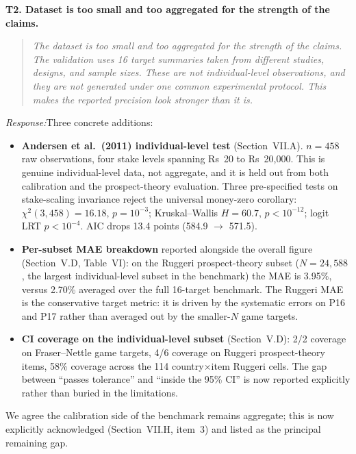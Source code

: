 \documentclass[11pt]{article}
\newcommand{\rev}[1]{\textbf{#1}}
\newcommand{\resp}{\medskip\noindent\emph{Response:}\quad}
\begin{document}
\rev{T2. Dataset is too small and too aggregated for the strength of the claims.}
\begin{quote}\itshape\small
The dataset is too small and too aggregated for the strength of the claims. The validation uses 16 target summaries taken from different studies, designs, and sample sizes. These are not individual-level observations, and they are not generated under one common experimental protocol. This makes the reported precision look stronger than it is.
\end{quote}
\resp Three concrete additions:
\begin{itemize}[leftmargin=*]
  \item \textbf{Andersen et al.~(2011) individual-level test} (Section~VII.A). $n=458$ raw
        observations, four stake levels spanning Rs~20 to Rs~20{,}000. This is genuine
        individual-level data, not aggregate, and it is held out from both calibration and
        the prospect-theory evaluation. Three pre-specified tests on stake-scaling invariance
        reject the universal money-zero corollary: $\chi^2(3,458){=}16.18,\,p{=}10^{-3}$;
        Kruskal--Wallis $H{=}60.7,\,p{<}10^{-12}$; logit LRT $p{<}10^{-4}$. AIC drops 13.4
        points (584.9 $\to$ 571.5).
  \item \textbf{Per-subset MAE breakdown} reported alongside the overall figure
        (Section~V.D, Table~VI): on the Ruggeri prospect-theory subset ($N{=}24{,}588$,
        the largest individual-level subset in the benchmark) the MAE is 3.95\%, versus
        2.70\% averaged over the full 16-target benchmark. The Ruggeri MAE is the
        conservative target metric: it is driven by the systematic errors on P16 and P17
        rather than averaged out by the smaller-$N$ game targets.
  \item \textbf{CI coverage on the individual-level subset} (Section~V.D): 2/2 coverage on
        Fraser--Nettle game targets, 4/6 coverage on Ruggeri prospect-theory items, 58\%
        coverage across the 114 country$\times$item Ruggeri cells. The gap between
        ``passes tolerance'' and ``inside the 95\% CI'' is now reported explicitly rather
        than buried in the limitations.
\end{itemize}
We agree the calibration side of the benchmark remains aggregate; this is now explicitly
acknowledged (Section~VII.H, item~3) and listed as the principal remaining gap.
\end{document}
